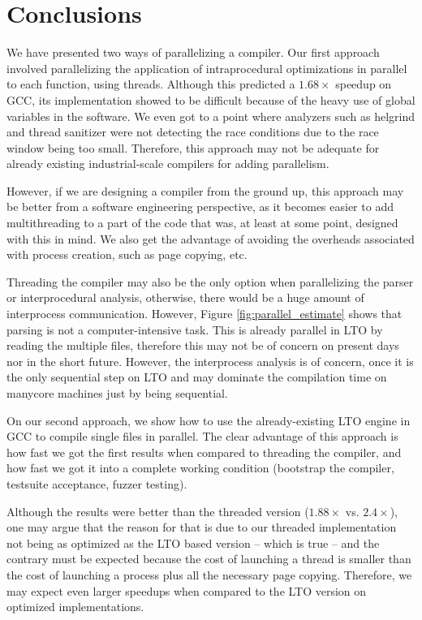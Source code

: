 \chapter{Conclusions}
\label{chap:conclusions}

We have presented two ways of parallelizing a compiler. Our first approach
involved parallelizing the application of intraprocedural optimizations in
parallel to each function, using threads. Although this predicted a $1.68\times$
speedup on GCC, its implementation showed to be difficult because of the heavy
use of global variables in the software.  We even got to a point where
analyzers such as helgrind and thread sanitizer were not detecting the race
conditions due to the race window being too small. Therefore, this approach may
not be adequate for already existing industrial-scale compilers for adding
parallelism.

However, if we are designing a compiler from the ground up, this approach may
be better from a software engineering perspective, as it becomes easier to add
multithreading to a part of the code that was, at least at some point, designed
with this in mind. We also get the advantage of avoiding the overheads
associated with process creation, such as page copying, etc.

Threading the compiler may also be the only option when parallelizing the
parser or interprocedural analysis, otherwise, there would be a huge amount of
interprocess communication. However, Figure \ref{fig:parallel_estimate} shows
that parsing is not a computer-intensive task. This is already parallel in LTO
by reading the multiple files, therefore this may not be of concern on present
days nor in the short future. However, the interprocess analysis is of concern,
once it is the only sequential step on LTO and may dominate the compilation
time on manycore machines just by being sequential.

On our second approach, we show how to use the already-existing LTO engine in
GCC to compile single files in parallel. The clear advantage of this approach
is how fast we got the first results when compared to threading the compiler,
and how fast we got it into a complete working condition (bootstrap the
compiler, testsuite acceptance, fuzzer testing).

Although the results were better than the threaded version ($1.88\times$ vs. $2.4\times$),
one may argue that the reason for that is due to our threaded implementation
not being as optimized as the LTO based version -- which is true -- and the
contrary must be expected because the cost of launching a thread is smaller
than the cost of launching a process plus all the necessary page copying.
Therefore, we may expect even larger speedups when compared to the LTO version
on optimized implementations.

